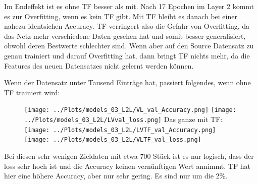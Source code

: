     Im Endeffekt ist es ohne TF besser als mit.
    Nach 17 Epochen im Layer 2 kommt es zur Overfitting, wenn 
    es kein TF gibt. Mit TF bleibt es danach bei einer nahezu 
    identsichen Accuracy. TF verringert also die Gefahr von 
    Overfitting, da das Netz mehr verschiedene Daten gesehen 
    hat und somit besser generalisiert, obwohl deren Bestwerte 
    schlechter sind. 
    Wenn aber auf den Source Datensatz zu genau trainiert und darauf 
    Overfitting hat, dann bringt TF nichts mehr, da die Features 
    des neuen Datensatzes nicht gelernt werden können. 

    Wenn der Datensatz unter Tausend Einträge hat, passiert folgendes, wenn ohne TF trainiert wird: 
    \begin{figure}[htpb]
        \texttt{[image: ../Plots/models\_03\_L2L/VL\_val\_Accuracy.png]}
        \texttt{[image: ../Plots/models\_03\_L2L/LVval\_loss.png]}
        Das ganze mit TF: 
        \texttt{[image: ../Plots/models\_03\_L2L/LVTF\_val\_Accuracy.png]}
        \texttt{[image: ../Plots/models\_03\_L2L/VLTF\_val\_loss.png]}
    \end{figure}

    Bei diesen sehr wenigen Zieldaten mit etwa 700 Stück ist es nur logisch, dass der loss sehr hoch 
    ist und die Accuracy keinen vernünftigen Wert annimmt. TF hat hier eine höhere Accuracy, aber nur sehr 
    gering. Es sind nur um die 2\%. 

